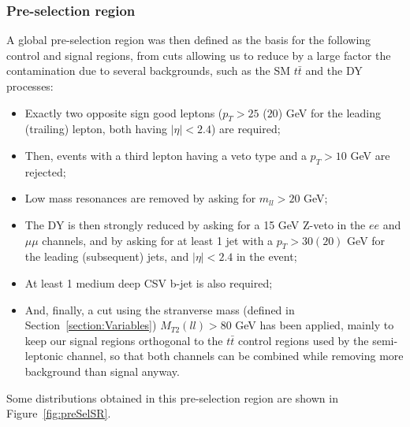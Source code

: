 \documentclass[a4paper, 10pt, openright]{report}
\begin{document}
\subsubsection{Pre-selection region} \label{section:PreSelCR}

A global pre-selection region was then defined as the basis for the following control and signal regions, from cuts allowing us to reduce by a large factor the contamination due to several backgrounds, such as the \ac{SM} $t \bar t$ and the \ac{DY} processes:

\begin{itemize}
\item Exactly two opposite sign good leptons ($p_T > 25$ ($20$) GeV for the leading (trailing) lepton, both having $|\eta| < 2.4$) are required;
\item Then, events with a third lepton having a veto type and a $p_T > 10$ GeV are rejected;
\item Low mass resonances are removed by asking for $m_{ll} > 20$ GeV;
\item The \ac{DY} is then strongly reduced by asking for a 15 GeV Z-veto in the $ee$ and $\mu \mu$ channels, and by asking for at least 1 jet with a $p_T > 30 (20)$ GeV for the leading (subsequent) jets, and $|\eta| < 2.4$ in the event;
\item At least 1 medium deep CSV b-jet is also required;
\item And, finally, a cut using the stranverse mass (defined in Section~\ref{section:Variables}) $M_{T2}(ll) > 80$ GeV has been applied, mainly to keep our signal regions orthogonal to the $t \bar t$ control regions used by the semi-leptonic channel, so that both channels can be combined while removing more background than signal anyway.
\end{itemize}

Some distributions obtained in this pre-selection region are shown in Figure~\ref{fig:preSelSR}.
\end{document}
